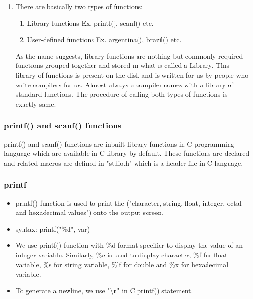 \begin{enumerate}
    \item There are basically two types of functions: 
    \begin{enumerate}
        \item Library functions Ex. printf(), scanf() etc.
        \item User-defined functions Ex. argentina(), brazil() etc.
    \end{enumerate}
    As the name suggests, library functions are nothing but commonly required functions grouped together and stored in what is called a Library. This library of functions is present on the disk and is written for us by people who write compilers for us. Almost always a compiler comes with a library of standard functions. The procedure of calling both types of functions is exactly same.
\end{enumerate}
    
\subsubsection{printf() and scanf() functions}
printf() and scanf() functions are inbuilt library functions in C programming language which are available in C library by default. These functions are declared and related macros are defined in "stdio.h" which is a header file in C language.

\subsubsection{printf}
\begin{itemize}
    \item printf() function is used to print the ("character, string, float, integer, octal and hexadecimal values") onto the output screen.
    \item syntax: printf("\%d", var)
    \item We use printf() function with \%d format specifier to display the value of an integer variable. Similarly, \%c is used to display character, \%f for float variable, \%s for string variable, \%lf for double and \%x for hexadecimal variable.
    \item To generate a newline, we use "\textbackslash n" in C printf() statement.
\end{itemize}

